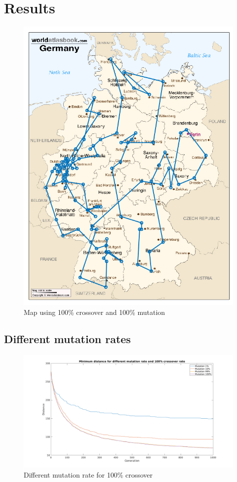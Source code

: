 \documentclass[a4paper, 12pt]{article}
\begin{document}
\newpage
\section{Results}

\begin{figure}[ht!]
  \centering
  \includegraphics[width=1.0\textwidth]{images/resultmap-mine-crop}
    \caption{Map using 100\% crossover and 100\% mutation \label{fig:xxx1}}
\end{figure}

\newpage
\subsection{Different mutation rates}

\begin{figure}[ht!]
	\centering
	\includegraphics[width=1.1\textwidth]{images/crossfig-mine}
	\caption{Different mutation rate for 100\% crossover \label{fig:crossfig}}
\end{figure}
\end{document}
